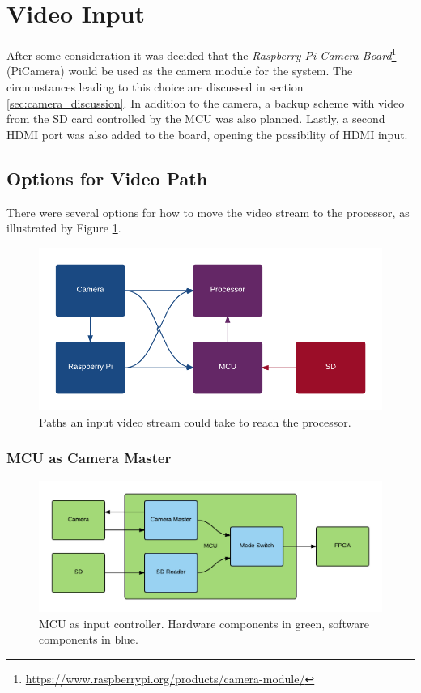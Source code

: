 \section{Video Input}
After some consideration it was decided that the \textit{Raspberry Pi Camera Board}\footnote{\url{https://www.raspberrypi.org/products/camera-module/}} (PiCamera) would be used as the camera module for the system.
The circumstances leading to this choice are discussed in section \ref{sec:camera_discussion}.
In addition to the camera, a backup scheme with video from the SD card controlled by the MCU was also planned.
Lastly, a second HDMI port was also added to the board, opening the possibility of HDMI input.




\subsection{Options for Video Path}
There were several options for how to move the video stream to the processor,
as illustrated by Figure \ref{fig:VideoPath}.

\begin{figure}
    \centering
    \includegraphics[width=\linewidth]{img/VideoPath}
    \caption{Paths an input video stream could take to reach the processor.}
    \label{fig:VideoPath}
\end{figure}

\subsubsection{MCU as Camera Master}
\begin{figure}
    \centering
    \includegraphics[width=\linewidth]{img/MCU_CameraMaster}
    \caption{MCU as input controller. Hardware components in green, software components in blue.}
    \label{fig:MCU_CameraMaster}
\end{figure}


